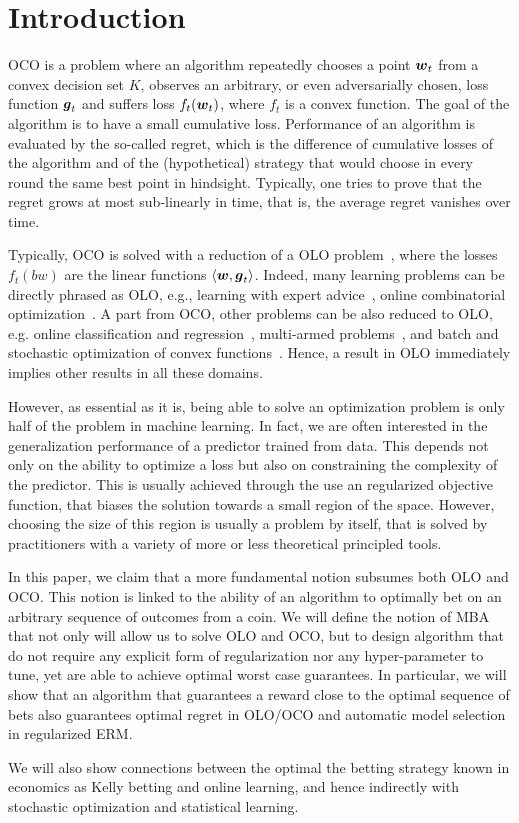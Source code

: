 \section{Introduction}
\label{sec:intro}

\acresetall

\ac{OCO} is a problem where an algorithm repeatedly chooses a point $\boldsymbol{w}_t$ from a convex decision set $K$, observes an arbitrary, or even adversarially chosen, loss function $\boldsymbol{g}_t$ and suffers loss $f_t(\boldsymbol{w}_t)$, where $f_t$ is a convex function.  The goal of the algorithm is to have a small cumulative loss. Performance of an algorithm is evaluated by the so-called regret, which is the difference of cumulative losses of the algorithm and of the (hypothetical) strategy that would choose in every round the same best point in hindsight.
Typically, one tries to prove that the regret grows at most sub-linearly in time, that is, the average regret vanishes over time.

Typically, \ac{OCO} is solved with a reduction of a \ac{OLO} problem~\citep{Cesa-BianchiL06,Shalev-Shwartz12}, where the losses $f_t(bw)$ are the linear functions $\langle \boldsymbol{w}, \boldsymbol{g}_t\rangle$.
Indeed, many learning problems can be directly phrased as \ac{OLO}, e.g., learning with expert advice~\citep{LittlestoneW94,Vovk98,Cesa-BianchiFHHSW97}, online combinatorial optimization~\cite{KoolenWK10}. A part from \ac{OCO}, other problems can be also reduced to \ac{OLO}, e.g. online classification and regression~\citep[Chapters~11~and~12]{Cesa-BianchiL06}, multi-armed problems~\citep[Chapter~6]{Cesa-BianchiL06}, and batch and stochastic optimization of convex functions~\cite{NemirovskyY83}.  Hence, a result in \ac{OLO} immediately implies other results in all these domains.

However, as essential as it is, being able to solve an optimization problem is only half of the problem in machine learning. In fact, we are often interested in the generalization performance of a predictor trained from data. This depends not only on the ability to optimize a loss but also on constraining the complexity of the predictor. This is usually achieved through the use an regularized objective function, that biases the solution towards a small region of the space. However, choosing the size of this region is usually a problem by itself, that is solved by practitioners with a variety of more or less theoretical principled tools.

In this paper, we claim that a more fundamental notion subsumes both \ac{OLO} and \ac{OCO}. This notion is linked to the ability of an algorithm to optimally bet on an arbitrary sequence of outcomes from a coin. We will define the notion of \ac{MBA} that not only will allow us to solve \ac{OLO} and \ac{OCO}, but to design algorithm that do not require any explicit form of regularization nor any hyper-parameter to tune, yet are able to achieve optimal worst case guarantees. 
In particular, we will show that an algorithm that guarantees a reward close to the optimal sequence of bets also guarantees optimal regret in \ac{OLO}/\ac{OCO} and automatic model selection in regularized \ac{ERM}.

We will also show connections between the optimal the betting strategy known in economics as Kelly betting \citep{Kelly56} and online learning, and hence indirectly with stochastic optimization and statistical learning.